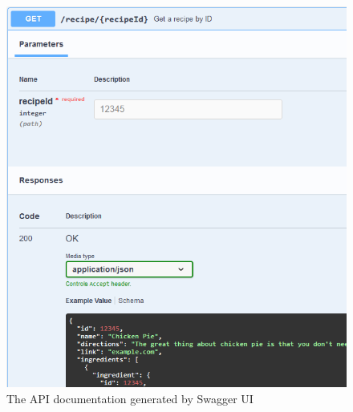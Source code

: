 \begin{figure}[ht]
  \centering
  \caption{\label{fig:api_docs}The API documentation generated by Swagger UI}
  \includegraphics[width=\columnwidth]{figures/api_docs_example.png}
\end{figure}

